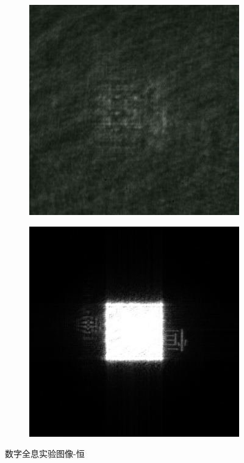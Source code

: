 \documentclass{ctexart}
\begin{document}
\begin{figure}[H]
  \centering
  \begin{subfigure}{.48\textwidth}
    \includegraphics[width=\linewidth]{数字全息实验数据/数字全息/恒/恒.jpg}
  \end{subfigure}
  \begin{subfigure}{.48\textwidth}
    \includegraphics[width=\linewidth]{数字全息实验数据/数字全息/恒/数字全息输出结果-恒.jpg}
  \end{subfigure}
  \caption{数字全息实验图像-恒}
\end{figure}
\end{document}
